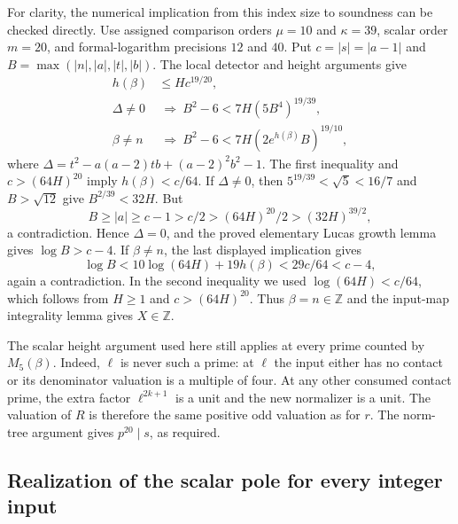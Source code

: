 \documentclass[11pt,a4paper]{article}
\theoremstyle{definition}
\theoremstyle{remark}
\begin{document}
For clarity, the numerical implication from this index size to
soundness can be checked directly. Use assigned comparison orders
$\mu=10$ and $\kappa=39$, scalar order $m=20$, and formal-logarithm
precisions $12$ and $40$. Put $c=|s|=|a-1|$ and
$B=\max(|n|,|a|,|t|,|b|)$. The local detector and height arguments give
\begin{align*}
 h(\beta)&\le Hc^{19/20},\\
 \Delta\ne0&\ \Longrightarrow\ B^2-6<7H(5B^4)^{19/39},\\
 \beta\ne n&\ \Longrightarrow\ B^2-6<7H(2e^{h(\beta)}B)^{19/10},
\end{align*}
where $\Delta=t^2-a(a-2)tb+(a-2)^2b^2-1$. The first inequality and
$c>(64H)^{20}$ imply $h(\beta)<c/64$.
If $\Delta\ne0$, then $5^{19/39}<\sqrt5<16/7$ and $B>\sqrt{12}$
give $B^{2/39}<32H$. But
\[
 B\ge |a|\ge c-1>c/2>(64H)^{20}/2>(32H)^{39/2},
\]
a contradiction. Hence $\Delta=0$, and the proved elementary Lucas
growth lemma gives $\log B>c-4$.
If $\beta\ne n$, the last displayed implication gives
\[
 \log B<10\log(64H)+19h(\beta)<29c/64<c-4,
\]
again a contradiction. In the second inequality we used
$\log(64H)<c/64$, which follows from $H\ge1$ and
$c>(64H)^{20}$. Thus $\beta=n\in\mathbb Z$ and the input-map
integrality lemma gives $X\in\mathbb Z$.

The scalar height argument used here still applies at every prime
counted by $M_5(\beta)$. Indeed, $\ell$ is never such a prime: at
$\ell$ the input either has no contact or its denominator valuation
is a multiple of four. At any other consumed contact prime, the extra
factor $\ell^{2k+1}$ is a unit and the new normalizer is a unit. The
valuation of $R$ is therefore the same positive odd valuation as for
$r$. The norm-tree argument gives $p^{20}\mid s$, as required.

\subsection{Realization of the scalar pole for every integer input}
\end{document}
